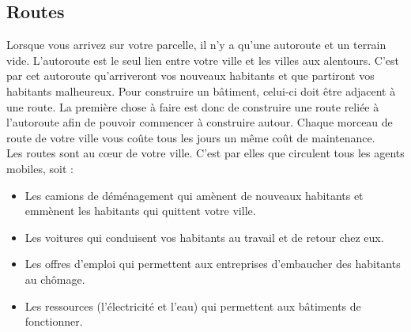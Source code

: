 \documentclass[11pt]{report}
\begin{document}
\subsection{Routes}
Lorsque vous arrivez sur votre parcelle, il n'y a qu'une autoroute et un terrain vide.
L'autoroute est le seul lien entre votre ville et les villes aux alentours. C'est par cet autoroute qu'arriveront vos nouveaux habitants et que partiront vos habitants malheureux.
Pour construire un bâtiment, celui-ci doit être adjacent à une route. La première chose à faire est donc de construire une route reliée à l'autoroute afin de pouvoir commencer à construire autour.
Chaque morceau de route de votre ville vous coûte tous les jours un même coût de maintenance.\\
Les routes sont au cœur de votre ville. C'est par elles que circulent tous les agents mobiles, soit :
\begin{itemize}
	\item Les camions de déménagement qui amènent de nouveaux habitants et emmènent les habitants qui quittent votre ville.
	\item Les voitures qui conduisent vos habitants au travail et de retour chez eux.
	\item Les offres d'emploi qui permettent aux entreprises d'embaucher des habitants au chômage.
	\item Les ressources (l'électricité et l'eau) qui permettent aux bâtiments de fonctionner.
\end{itemize}
\end{document}

